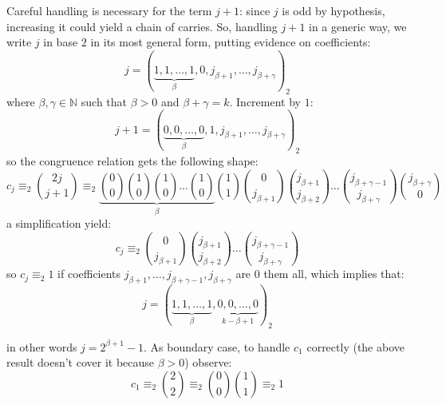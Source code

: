 \begin{itemize}
        Careful handling is necessary for the term $j+1$: 
        since $j$ is odd by hypothesis, increasing it could yield a chain of carries.
        So, handling $j+1$ in a generic way, we write
        $j$ in base $2$ in its most general form, putting evidence on coefficients:
        \begin{displaymath}
            j=\left(\underbrace{1,1,\ldots,1}_{\beta},0,j_{\beta+1},\ldots,j_{\beta+\gamma}\right)_{2}
        \end{displaymath}
        where $\beta,\gamma\in\mathbb{N}$ such that $\beta>0$ and $\beta+\gamma=k$. 
        Increment by $1$:
        \begin{displaymath}
            j+1=\left(\underbrace{0,0,\ldots,0}_{\beta},1,j_{\beta+1},\ldots,j_{\beta+\gamma}%
                \right)_{2}
        \end{displaymath}
        so the congruence relation gets the following shape:
        \begin{displaymath}
            c_{j}\equiv_{2}{{2j}\choose{j+1}}
                \equiv_{2} \underbrace{{{0}\choose{0}}{{1}\choose{0}}
                {{1}\choose{0}}\ldots{{1}\choose{0}}}_{\beta} 
                    {{1}\choose{1}}{{0}\choose{j_{\beta+1}}}{{j_{\beta+1}}\choose{j_{\beta+2}}}
                    \ldots{{j_{\beta+\gamma-1}}\choose{j_{\beta+\gamma}}}{{j_{\beta+\gamma}}\choose{0}}%
        \end{displaymath}
        a simplification yield:
        \begin{displaymath}
            c_{j}\equiv_{2} {{0}\choose{j_{\beta+1}}}
                {{j_{\beta+1}}\choose{j_{\beta+2}}}
                    \ldots{{j_{\beta+\gamma-1}}\choose{j_{\beta+\gamma}}}
        \end{displaymath}
        so $c_{j}\equiv_{2} 1$ if coefficients 
            $j_{\beta+1}, \ldots, j_{\beta+\gamma-1},j_{\beta+\gamma}$
        are $0$ them all, which implies that:
        \begin{displaymath}
            j=\left(\underbrace{1,1,\ldots,1}_{\beta},\underbrace{0,0,\ldots,0}_{k-\beta+1}\right)_{2}
        \end{displaymath}

        in other words $j = 2^{\beta+1}-1$. As boundary case, to handle $c_{1}$ correctly 
        (the above result doesn't cover it because $\beta>0$) observe:
        \begin{displaymath}
            c_{1}\equiv_{2} {{2}\choose{2}}\equiv_{2} {{0}\choose{0}}{{1}\choose{1}}\equiv_{2}1
        \end{displaymath}
\end{itemize}

